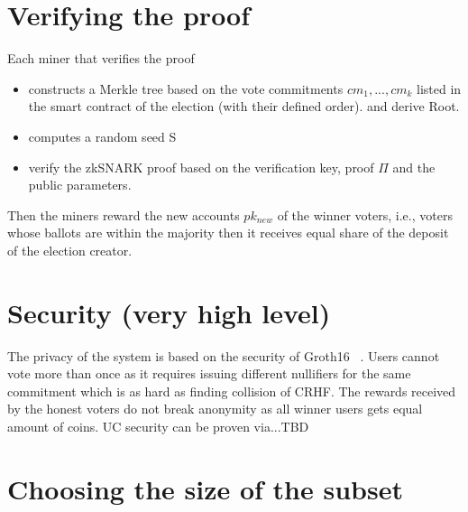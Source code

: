 \documentclass[]{paper}
\newtheorem{theorem}{Theorem}
\begin{document}
\section{Verifying the proof}
Each miner that verifies the proof 
\begin{itemize}
	\item constructs a Merkle tree based on the vote commitments $cm_1,...,cm_k$  listed in the smart contract of the election (with their defined order). and derive Root. 
	\item computes a random seed S
	\item verify the zkSNARK proof based on the verification key, proof $\Pi$ and the public parameters.
\end{itemize}

Then the miners reward the new accounts $pk_{new}$ of the winner voters, i.e., voters whose ballots are within the majority then it receives equal share of the deposit of the election creator. 



\section{Security (very high level)}
The privacy of the system is based on the security of Groth16 ~\cite{}. Users cannot vote more than once as it requires issuing different nullifiers for the same commitment which is as hard as finding collision of CRHF. The rewards received by the honest voters do not break anonymity as all winner users gets equal amount of coins. UC security can be proven via...TBD

\section{Choosing the size of the subset}
\end{document}
